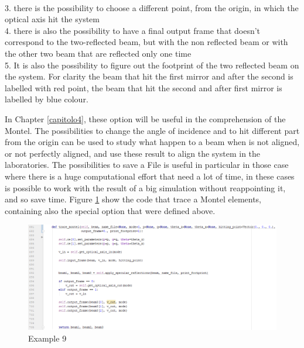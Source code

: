 	\\ \hspace{20mm} 3. there is the possibility to choose a different point, from the origin, in which the optical axis hit the system
	\\ \hspace{20mm} 4. there is also the possibility to have a final output frame that doesn't correspond to the two-reflected beam, but with the non reflected beam or with the other two beam that are reflected only one time
	\\ \hspace{20mm} 5. It is also the possibility to figure out the footprint of the two reflected beam on the system. For clarity the beam that hit the first mirror and after the second is labelled with red point, the beam that hit the second and after first mirror is labelled by blue colour.

\noindent In Chapter \ref{capitolo4}, these option will be useful in the comprehension of the Montel. The possibilities to change the angle of incidence and to hit different part from the origin can be used to study what happen to a beam when is not aligned, or not perfectly aligned, and use these result to align the system in the laboratories. The possibilities to save a File is useful in particular in those case where there is a huge computational effort that need a lot of time, in these cases is possible to work with the result of a big simulation without reappointing it, and so save time. Figure \ref{fig: CodeTraceMontel} show the code that trace a Montel elements, containing also the special option that were defined above.
\begin{figure}[H]
%
\centering
%
\includegraphics[width=.65\textwidth]{Immagini/Chapter3/CodeTraceMontel}
%
\caption{Example 9}
%
\label{fig: CodeTraceMontel}
%
\end{figure}